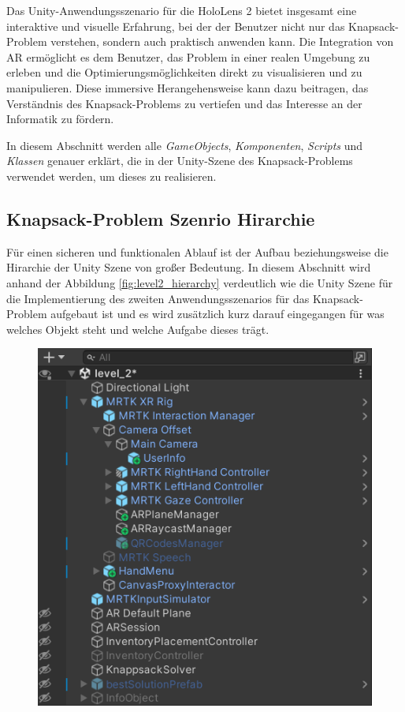 \begin{itemize}
Das Unity-Anwendungsszenario für die HoloLens 2 bietet insgesamt eine interaktive und visuelle Erfahrung, bei der der
Benutzer nicht nur das Knapsack-Problem verstehen, sondern auch praktisch anwenden kann. Die Integration von AR ermöglicht
es dem Benutzer, das Problem in einer realen Umgebung zu erleben und die Optimierungsmöglichkeiten direkt zu visualisieren
und zu manipulieren. Diese immersive Herangehensweise kann dazu beitragen, das Verständnis des Knapsack-Problems zu vertiefen
und das Interesse an der Informatik zu fördern.

In diesem Abschnitt werden alle \textit{GameObjects}, \textit{Komponenten}, \textit{Scripts} und \textit{Klassen} genauer
erklärt, die in der Unity-Szene des Knapsack-Problems verwendet werden, um dieses zu realisieren.

\subsection{Knapsack-Problem Szenrio Hirarchie} 
Für einen sicheren und funktionalen Ablauf ist der Aufbau beziehungsweise die Hirarchie der Unity Szene von großer Bedeutung.
In diesem Abschnitt wird anhand der Abbildung \ref{fig:level2_hierarchy} verdeutlich wie die Unity Szene für die Implementierung
des zweiten Anwendungsszenarios für das Knapsack-Problem aufgebaut ist und es wird zusätzlich kurz darauf eingegangen
für was welches Objekt steht und welche Aufgabe dieses trägt.
\\
\begin{figure}[H]
    \centering
    \includegraphics[scale=0.8]{images/Level2Hirarchy}

\end{figure}
\end{itemize}
